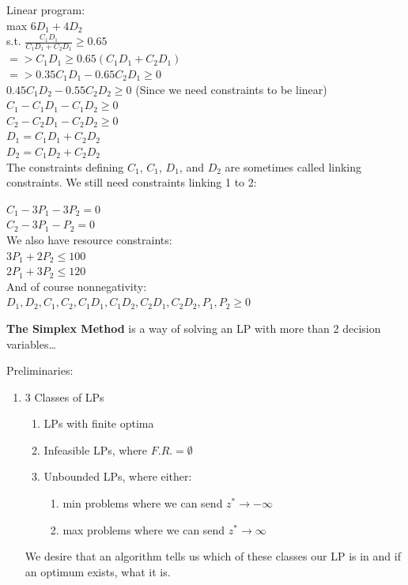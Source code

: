 \documentclass{article}
\begin{document}
\begin{eg}
    Linear program: \\
    max \(6D_1+4D_2\) \\
    s.t. \(\frac{C_1D_1}{C_1D_1+C_2D_1}\geq0.65\) \\
    \(=>C_1D_1\geq0.65(C_1D_1+C_2D_1)\) \\
    \(=>0.35C_1D_1-0.65C_2D_1\geq0\) \\
    \(0.45C_1D_2-0.55C_2D_2\geq0\) (Since we need constraints to be linear) \\
    \(C_1-C_1D_1-C_1D_2\geq0\) \\
    \(C_2-C_2D_1-C_2D_2\geq0\) \\
    \(D_1=C_1D_1+C_2D_2\) \\
    \(D_2=C_1D_2+C_2D_2\) \\

    The constraints defining \(C_1\), \(C_1\), \(D_1\), and \(D_2\) are sometimes called 
    linking constraints. We still need constraints linking 1 to 2:

    \(C_1-3P_1-3P_2=0\) \\
    \(C_2-3P_1-P_2=0\)  \\

    We also have resource constraints: \\
    \(3P_1+2P_2\leq100\) \\
    \(2P_1+3P_2\leq120\)  \\

    And of course nonnegativity: \\
    \(D_1, D_2, C_1, C_2, C_1D_1, C_1D_2, C_2D_1, C_2D_2, P_1, P_2 \geq 0\) 

    \begin{definition}
        \textbf{The Simplex Method} is a way of solving an LP with more than 2 decision variables\dots
        
        Preliminaries: \\
        \begin{enumerate}
            \item 3 Classes of LPs 
            \begin{enumerate}
                \item LPs with finite optima
                \item Infeasible LPs, where \(F.R.=\emptyset\) 
                \item Unbounded LPs, where either:
                \begin{enumerate}
                    \item min problems where we can send \(z^*\rightarrow-\infty\) 
                    \item max problems where we can send \(z^*\rightarrow\infty\) 
                \end{enumerate}
            \end{enumerate}
            We desire that an algorithm tells us which of these classes our LP is in 
            and if an optimum exists, what it is.
        \end{enumerate}
    \end{definition}
\end{eg}
\end{document}
